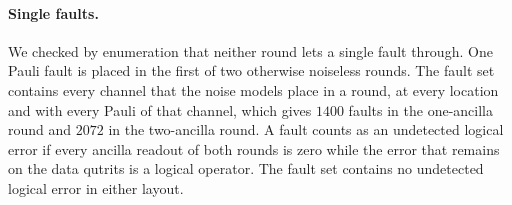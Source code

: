 \begin{table}[tb]
  \caption{Gate moments of one check round in the two layouts, as scheduled in the simulations. Each round starts with one moment that resets its four ancillas and ends with one moment that reads them out. $\mathrm{SUM}(a \to b)$ adds the computational-basis value of $a$ to $b$, and $\mathrm{SUM}^{-1}(a \to b)$ subtracts it. For a site in the $X$ basis, between its $H$ and its $H^{-1}$, $\mathrm{SUM}(a \to b)$ instead subtracts the $X$-basis value of $b$ from that of $a$, so that $X$-basis values move against the arrow. In the two-ancilla round, N measures $G_3$ and S measures $G_4$ in moments 1 to 5, while E collects the part on $q_1$, lends it to $q_4$ in moment 3 and takes it back in moment 5. E clears itself against $q_1$ in moment 6 and measures $G_2$ in moments 8 to 10. N collects $-z_1$ in moment 7, lends its value to $q_0$ in moment 8, takes it back in moment 10 and clears itself against $q_1$ in moment 11. W collects $-z_3$ in moment 3 and the value of $q_0$ in moment 9.}
  \label{tab:conv_round}
\end{table}

\paragraph{Single faults.} We checked by enumeration that neither round lets a single fault through. One Pauli fault is placed in the first of two otherwise noiseless rounds. The fault set contains every channel that the noise models place in a round, at every location and with every Pauli of that channel, which gives $1400$ faults in the one-ancilla round and $2072$ in the two-ancilla round. A fault counts as an undetected logical error if every ancilla readout of both rounds is zero while the error that remains on the data qutrits is a logical operator. The fault set contains no undetected logical error in either layout.

